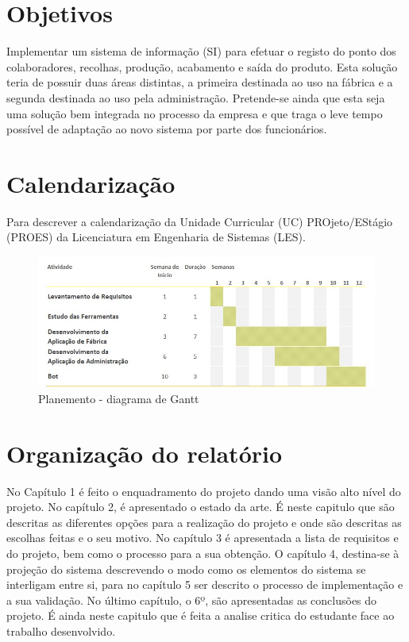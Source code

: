\section{Objetivos}
Implementar um sistema de informação (SI\label{sym:SI}) para efetuar o registo do ponto dos colaboradores, recolhas, produção, acabamento e saída do produto. Esta solução teria de possuir duas áreas distintas, a primeira destinada ao uso na fábrica e a segunda destinada ao uso pela administração. Pretende-se ainda que esta seja uma solução bem integrada no processo da empresa e que traga o leve tempo possível de adaptação ao novo sistema por parte dos funcionários.

\section{Calendarização}
Para descrever a calendarização da Unidade Curricular (UC\label{sym:UC}) PROjeto/EStágio (PROES\label{sym:PROES}) da Licenciatura em Engenharia de Sistemas (LES\label{sym:LES}).

\begin{figure}[htbp] 
	\begin{center}
		\includegraphics[width=\textwidth,keepaspectratio]{figuras/DiagramaGant.jpg}
		\caption{Planemento - diagrama de Gantt}
		\label{fig:gantt chart} 
	\end{center}
\end{figure}

\section{Organização do relatório}
No Capítulo 1 é feito o enquadramento do projeto dando uma visão alto nível do projeto. No capítulo 2, é apresentado o estado da arte. É neste capitulo que são descritas as diferentes opções para a realização do projeto e onde são descritas as escolhas feitas e o seu motivo. No capítulo 3 é apresentada a lista de requisitos e do projeto, bem como o processo para a sua obtenção. O capítulo 4, destina-se à projeção do sistema descrevendo o modo como os elementos do sistema se interligam entre si, para no capítulo 5 ser descrito o processo de implementação e a sua validação. No último capítulo, o 6º, são apresentadas as conclusões do projeto. É ainda neste capitulo que é feita a analise critica do estudante face ao trabalho desenvolvido.

